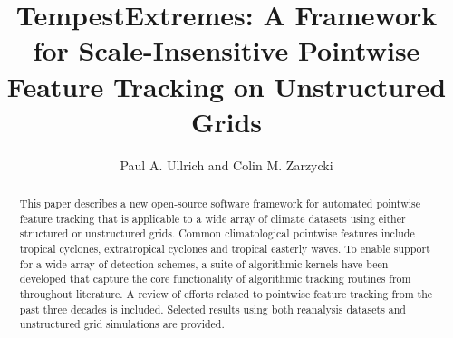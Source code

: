 \documentclass[gmdd, hvmath]{copernicus}
\begin{document}
\linenumbers

\title{TempestExtremes:  A Framework for Scale-Insensitive Pointwise Feature Tracking on Unstructured Grids}

\author{Paul A. Ullrich and Colin M. Zarzycki}







\received{}
\pubdiscuss{} %
\revised{}
\accepted{}
\published{}




\maketitle  %



\begin{abstract}
This paper describes a new open-source software framework for automated pointwise feature tracking that is applicable to a wide array of climate datasets using either structured or unstructured grids.  Common climatological pointwise features include tropical cyclones, extratropical cyclones and tropical easterly waves.  To enable support for a wide array of detection schemes, a suite of algorithmic kernels have been developed that capture the core functionality of algorithmic tracking routines from throughout literature. A review of efforts related to pointwise feature tracking from the past three decades is included. Selected results using both reanalysis datasets and unstructured grid simulations are provided.
\end{abstract}


\end{document}
